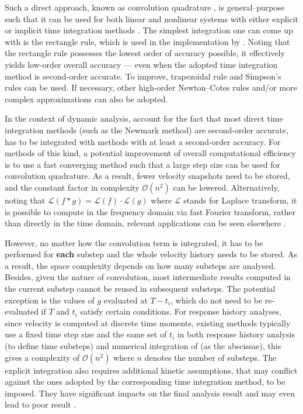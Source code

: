 Such a direct approach, known as convolution quadrature \citep[see][and the references therein]{Lubich2004}, is general--purpose such that it can be used for both linear and nonlinear systems with either explicit or implicit time integration methods \citep[see, e.g.,][]{Katsikadelis2019}. The simplest integration one can come up with is the rectangle rule, which is used in the implementation by \citet{Puthanpurayil2014}. Noting that the rectangle rule possesses the lowest order of accuracy possible, it effectively yields low-order overall accuracy --- even when the adopted time integration method is second-order accurate. To improve, trapezoidal rule \citep[e.g.,][]{Liu2014} and Simpson's rules \citep[e.g.,][]{Shen2019} can be used. If necessary, other high-order Newton--Cotes rules and/or more complex approximations \citep{Schaedle2006,Shen2021} can also be adopted.

In the context of dynamic analysis, account for the fact that most direct time integration methods (such as the Newmark method) are second-order accurate,  has to be integrated with methods with at least a second-order accuracy. For methods of this kind, a potential improvement of overall computational efficiency is to use a fast converging method \citep{Schaedle2006} such that a large step size can be used for convolution quadrature. As a result, fewer velocity snapshots need to be stored, and the constant factor in complexity $\mathcal{O}\left(n^2\right)$ can be lowered.
Alternatively, noting that $\mathcal{L}\left(f*g\right)=\mathcal{L}\left(f\right)\cdot\mathcal{L}\left(g\right)$ where $\mathcal{L}$ stands for Laplace transform, it is possible to compute  in the frequency domain via fast Fourier transform, rather than directly in the time domain, relevant applications can be seen elsewhere \citep{Pan2013,Zhao2019}.

However, no matter how the convolution term is integrated, it has to be performed for \textbf{each} substep and the whole velocity history needs to be stored. As a result, the space complexity depends on how many substeps are analysed. Besides, given the nature of convolution, most intermediate results computed in the current substep cannot be reused in subsequent substeps. The potential exception is the values of $g$ evaluated at $T-t_i$, which do not need to be re-evaluated if $T$ and $t_i$ satisfy certain conditions. For response history analyses, since velocity is computed at discrete time moments, existing methods typically use a fixed time step size and the same set of $t_i$ in both response history analysis (to define time substeps) and numerical integration of  (as the abscissae), this gives a complexity of $\mathcal{O}\left(n^2\right)$ where $n$ denotes the number of substeps. The explicit integration also requires additional kinetic assumptions, that may conflict against the ones adopted by the corresponding time integration method, to be imposed. They have significant impacts on the final analysis result \citep[see][]{Liu2014} and may even lead to poor result \cite[see][Figs. 12, 17, 25, 26]{Liu2023}.

